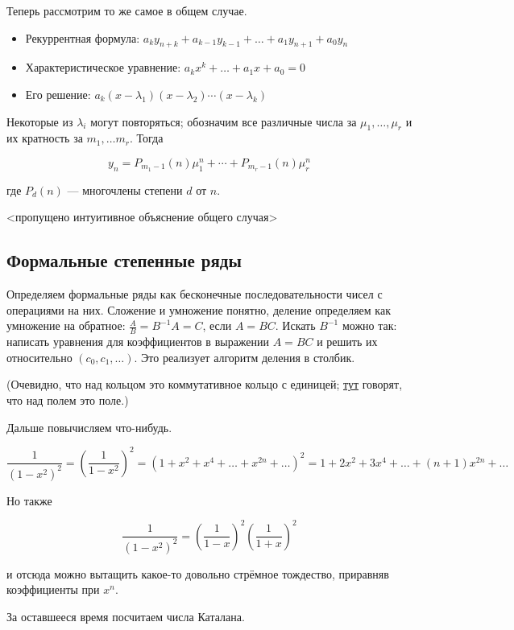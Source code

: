 \documentclass[12pt]{article}
\begin{document}
Теперь рассмотрим то же самое в общем случае.

\begin{itemize}
\item Рекуррентная формула: $a_k y_{n + k} + a_{k - 1} y_{k - 1} + \ldots + a_1 y_{n + 1} + a_0 y_n$
\item Характеристическое уравнение: $a_k x^k + \ldots + a_1 x + a_0 = 0$
\item Его решение: $a_k(x - \lambda_1) (x - \lambda_2) \cdots (x - \lambda_k)$
\end{itemize}

Некоторые из $\lambda_i$ могут повторяться; обозначим все различные числа за $\mu_1, \ldots, \mu_r$ и их кратность за $m_1, \ldots m_r$. Тогда

\[
y_n = P_{m_1 - 1}(n) \mu_1^n + \cdots + P_{m_r - 1}(n) \mu_r^n
\]

где $P_d(n)$ — многочлены степени $d$ от $n$.

<пропущено интуитивное объяснение общего случая>

\subsection{Формальные степенные ряды}

Определяем формальные ряды как бесконечные последовательности чисел с операциями на них. Сложение и умножение понятно, деление определяем как умножение на обратное: $\frac A B = B^{-1} A = C$, если $A = BC$. Искать $B^{-1}$ можно так: написать уравнения для коэффициентов в выражении $A = BC$ и решить их относительно $(c_0, c_1, \ldots )$. Это реализует алгоритм деления в столбик.

(Очевидно, что над кольцом это коммутативное кольцо с единицей; \href{http://stu.sernam.ru/book\_t\_galua.php?id=38}{тут} говорят, что над полем это поле.)

Дальше повычисляем что-нибудь.

\[
\frac 1 {(1 - x^2)^2} = \left( \frac 1 {1 - x^2} \right)^2 = (1 + x^2 + x^4 + \ldots + x^{2n} + \ldots)^2 = 1 + 2x^2 + 3x^4 + \ldots + (n + 1) x^{2n} + \ldots
\]

Но также

\[
\frac 1 {(1 - x^2)^2} = \left( \frac 1 {1 - x} \right)^2 \left( \frac 1 {1 + x} \right)^2
\]

и отсюда можно вытащить какое-то довольно стрёмное тождество, приравняв коэффициенты при $x^n$.

За оставшееся время посчитаем числа Каталана.
\end{document}
